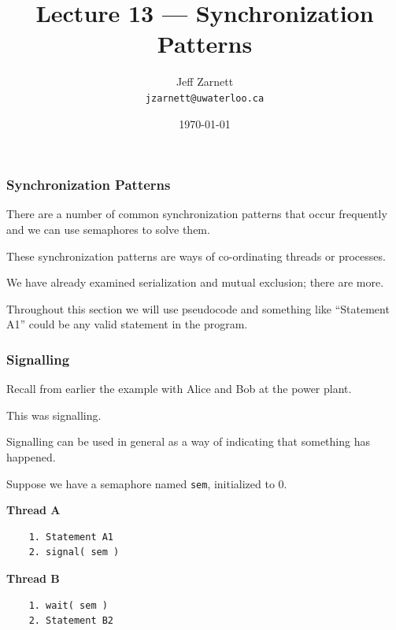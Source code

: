 

\title{Lecture 13 --- Synchronization Patterns }

\author{Jeff Zarnett \\ \small \texttt{jzarnett@uwaterloo.ca}}
\date{\today}




\begin{frame}
  \titlepage

 \end{frame}

\begin{frame}
\frametitle{Synchronization Patterns}


There are a number of common synchronization patterns that occur frequently and we can use semaphores to solve them. 

These synchronization patterns are ways of co-ordinating threads or processes. 

We have already examined serialization and mutual exclusion; there are more. 

Throughout this section we will use pseudocode and something like ``Statement A1'' could be any valid statement in the program.

\end{frame}

\begin{frame}[fragile]
\frametitle{Signalling}

Recall from earlier the example with Alice and Bob at the power plant. 

This was signalling.

Signalling can be used in general as a way of indicating that something has happened. 

Suppose we have a semaphore named \texttt{sem}, initialized to 0.

\begin{multicols}{2}
\textbf{Thread A}
  \begin{verbatim}
	1. Statement A1
	2. signal( sem )
  \end{verbatim}
\columnbreak
\textbf{Thread B}
  \begin{verbatim}
	1. wait( sem )
	2. Statement B2
  \end{verbatim}
\end{multicols}
\vspace{-2em}


\end{frame}


